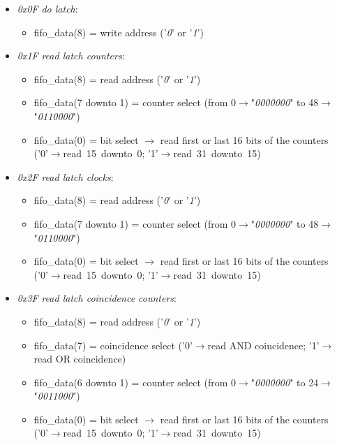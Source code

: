 \begin{itemize}
	\item \textit{0x0F} \textit{do latch}: 
	\begin{itemize}
		\item fifo\_data(8) = write address ('\textit{0}' or '\textit{1}')
	\end{itemize}
	\item \textit{0x1F} \textit{read latch counters}:
	\begin{itemize}
		\item fifo\_data(8) = read address ('\textit{0}' or '\textit{1}')
		\item fifo\_data(7 downto 1) = counter select (from 0$\rightarrow$"\textit{0000000}" to 48$\rightarrow$"\textit{0110000}")
		\item fifo\_data(0) = bit select $\rightarrow$ read first or last 16 bits of the counters \\('0'$\rightarrow$read~15~downto~0; '1'$\rightarrow$read~31~downto~15)
	\end{itemize}
	\item \textit{0x2F} \textit{read latch clocks}:
	\begin{itemize}
		\item fifo\_data(8) = read address ('\textit{0}' or '\textit{1}')
		\item fifo\_data(7 downto 1) = counter select (from 0$\rightarrow$"\textit{0000000}" to 48$\rightarrow$"\textit{0110000}")
		\item fifo\_data(0) = bit select $\rightarrow$ read first or last 16 bits of the counters \\('0'$\rightarrow$read~15~downto~0; '1'$\rightarrow$read~31~downto~15)
	\end{itemize}
	\item \textit{0x3F} \textit{read latch coincidence counters}:
	\begin{itemize}
		\item fifo\_data(8) = read address ('\textit{0}' or '\textit{1}')
		\item fifo\_data(7) = coincidence select ('0'$\rightarrow$read AND coincidence; '1'$\rightarrow$read OR coincidence)
		\item fifo\_data(6 downto 1) = counter select (from 0$\rightarrow$"\textit{0000000}" to 24$\rightarrow$"\textit{0011000}")
		\item fifo\_data(0) = bit select $\rightarrow$ read first or last 16 bits of the counters \\('0'$\rightarrow$read~15~downto~0; '1'$\rightarrow$read~31~downto~15)

\end{itemize}
\end{itemize}
